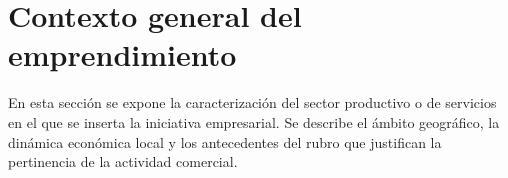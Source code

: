 \section{Contexto general del emprendimiento}
\label{sec:contexto_general}

En esta sección se expone la caracterización del sector productivo o de servicios en el que se inserta la iniciativa empresarial. Se describe el ámbito geográfico, la dinámica económica local y los antecedentes del rubro que justifican la pertinencia de la actividad comercial.
